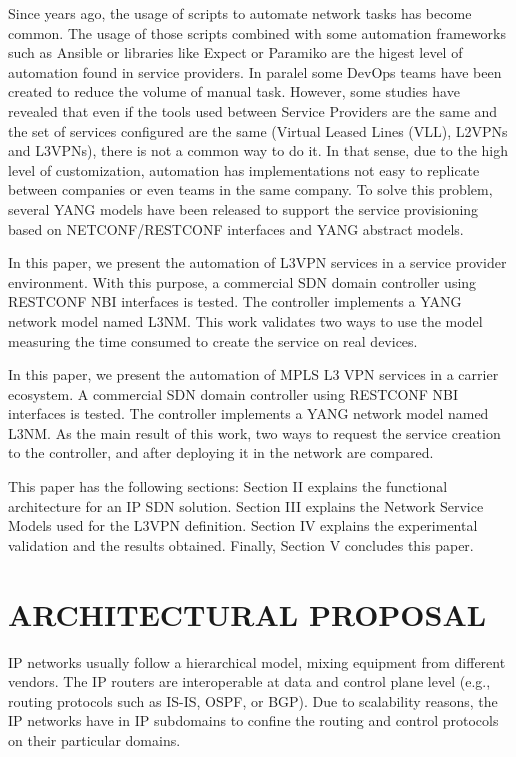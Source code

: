 \documentclass[conference]{IEEEtran}
\begin{document}
Since years ago, the usage of scripts to automate network tasks has become common. The usage of those scripts combined with some automation frameworks such as Ansible \cite{libes1995exploring} or libraries like Expect \cite{hochstein2017ansible} or Paramiko \cite{zadka2019paramiko} are the higest level of automation found in service providers. In paralel some DevOps teams have been created to reduce the volume of manual task. However, some studies have revealed that even if the tools used between Service Providers are the same and the set of services configured are the same (Virtual Leased Lines (VLL), L2VPNs and L3VPNs), there is not a common way to do it. In that sense, due to the high level of customization, automation has implementations not easy to replicate between companies or even teams in the same company. To solve this problem, several YANG models have been released to support the service provisioning based on NETCONF/RESTCONF \cite{enns2011network,bierman2017RESTCONF} interfaces and YANG \cite{bjorklund2016yang} abstract models. 

In this paper, we present the automation of L3VPN services in a service provider environment. With this purpose, a commercial SDN domain controller using RESTCONF NBI interfaces is tested. The controller implements a YANG network model named L3NM. This work validates two ways to use the model measuring the time consumed to create the service on real devices. 

In this paper, we present the automation of MPLS L3 VPN services in a carrier ecosystem. A commercial SDN domain controller using RESTCONF NBI interfaces is tested. The controller implements a YANG network model named L3NM.  As the main result of this work, two ways to request the service creation to the controller, and after deploying it in the network are compared.

This paper has the following sections: Section II explains the functional architecture for an IP SDN solution. Section III explains the Network Service Models used for the L3VPN definition. Section IV  explains the experimental validation and the results obtained. Finally, Section V concludes this paper. 

\section{ARCHITECTURAL PROPOSAL}

IP networks usually follow a hierarchical model, mixing equipment from different vendors. The IP routers are interoperable at data and control plane level (e.g., routing protocols such as IS-IS, OSPF, or BGP). Due to scalability reasons, the IP networks have in IP subdomains to confine the routing and control protocols on their particular domains.
\end{document}
